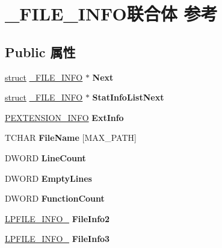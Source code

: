 \hypertarget{struct___f_i_l_e___i_n_f_o}{}\section{\+\_\+\+F\+I\+L\+E\+\_\+\+I\+N\+F\+O联合体 参考}
\label{struct___f_i_l_e___i_n_f_o}
\subsection*{Public 属性}
\begin{DoxyCompactItemize}
\item 
\mbox{\label{struct___f_i_l_e___i_n_f_o_a146693d336ad2da1c79477df9876be40}} 
\hyperlink{interfacestruct}{struct} \hyperlink{struct___f_i_l_e___i_n_f_o}{\+\_\+\+F\+I\+L\+E\+\_\+\+I\+N\+FO} $\ast$ {\bfseries Next}
\item 
\mbox{\label{struct___f_i_l_e___i_n_f_o_ac0e20f4c73a026235597fdc7d7a6d475}} 
\hyperlink{interfacestruct}{struct} \hyperlink{struct___f_i_l_e___i_n_f_o}{\+\_\+\+F\+I\+L\+E\+\_\+\+I\+N\+FO} $\ast$ {\bfseries Stat\+Info\+List\+Next}
\item 
\mbox{\label{struct___f_i_l_e___i_n_f_o_a348531a477ecbd7fdb8abf87fd4038d8}} 
\hyperlink{struct___e_x_t_e_n_s_i_o_n___i_n_f_o}{P\+E\+X\+T\+E\+N\+S\+I\+O\+N\+\_\+\+I\+N\+FO} {\bfseries Ext\+Info}
\item 
\mbox{\label{struct___f_i_l_e___i_n_f_o_aba2e17975dd1aee79f2d907ecabc5ea8}} 
T\+C\+H\+AR {\bfseries File\+Name} \mbox{[}M\+A\+X\+\_\+\+P\+A\+TH\mbox{]}
\item 
\mbox{\label{struct___f_i_l_e___i_n_f_o_ab5eb91f356b4d291c474e6404157dd26}} 
D\+W\+O\+RD {\bfseries Line\+Count}
\item 
\mbox{\label{struct___f_i_l_e___i_n_f_o_a41ecbaa08b6df4041c2fe37aade324b3}} 
D\+W\+O\+RD {\bfseries Empty\+Lines}
\item 
\mbox{\label{struct___f_i_l_e___i_n_f_o_a0c3b1017dba259bb6e7be1cb0b94e2a9}} 
D\+W\+O\+RD {\bfseries Function\+Count}
\item 
\mbox{\label{struct___f_i_l_e___i_n_f_o_a101b42d0b47d64d180c919b693a03abf}} 
\hyperlink{struct___f_i_l_e___i_n_f_o__2}{L\+P\+F\+I\+L\+E\+\_\+\+I\+N\+F\+O\+\_} {\bfseries File\+Info2}
\item 
\mbox{\label{struct___f_i_l_e___i_n_f_o_a6165f9c03161029024aabf3a748a1e7d}} 
\hyperlink{struct___f_i_l_e___i_n_f_o__3}{L\+P\+F\+I\+L\+E\+\_\+\+I\+N\+F\+O\+\_} {\bfseries File\+Info3}
\end{DoxyCompactItemize}


